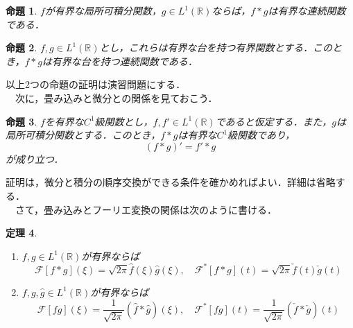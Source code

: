\documentclass[a4j]{jsbook}
\newtheorem{theorem}{定理}
\newtheorem{prop}[theorem]{命題}
\numberwithin{theorem}{chapter}  %
\begin{document}
\begin{prop}
\label{prop3-14}
\(f\)が有界な局所可積分関数，\(g\in L^1(\mathbb{R})\)ならば，\(f*g\)は有界な連続関数である．
\end{prop}
\begin{prop}
\label{prop3-15}
\(f, g\in L^1(\mathbb{R})\)とし，これらは有界な台を持つ有界関数とする．このとき，\(f*g\)は有界な台を持つ連続関数である．
\end{prop}
以上2つの命題の証明は演習問題にする．\\
　次に，畳み込みと微分との関係を見ておこう．
\begin{prop}
\label{prop3-16}
\(f\)を有界な\(C^1\)級関数とし，\(f, f'\in L^1(\mathbb{R})\)であると仮定する．また，\(g\)は局所可積分関数とする．このとき，\(f*g\)は有界な\(C^1\)級関数であり，
\begin{equation*}
    (f*g)'=f'*g
\end{equation*}
が成り立つ．
\end{prop}
証明は，微分と積分の順序交換ができる条件を確かめればよい．詳細は省略する．\\
　さて，畳み込みとフーリエ変換の関係は次のように書ける．
\begin{theorem}
\label{th3-17}
\begin{enumerate}
    \renewcommand{\labelenumi}{(\arabic{enumi})}
    \item \(f, g\in L^1(\mathbb{R})\)が有界ならば
    \begin{equation*}
        \mathcal{F}[f*g](\xi)=\sqrt{2\pi}\hat{f}(\xi)\hat{g}(\xi),\quad\mathcal{F}^*[f*g](t)=\sqrt{2\pi}\check{f}(t)\check{g}(t)
    \end{equation*}
    \item \(f, g, \hat{g}\in L^1(\mathbb{R})\)が有界ならば
    \begin{equation*}
        \mathcal{F}[fg](\xi)=\frac{1}{\sqrt{2\pi}}\left(\hat{f}*\hat{g}\right)(\xi),\quad\mathcal{F}^*[fg](t)=\frac{1}{\sqrt{2\pi}}\left(\check{f}*\check{g}\right)(t)
    \end{equation*}
\end{enumerate}
\end{theorem}
\end{document}
